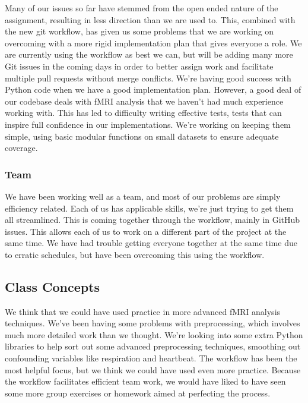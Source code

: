 \documentclass[11pt]{article}
\begin{document}
Many of our issues so far have stemmed from the open ended nature of the
assignment, resulting in less direction than we are used to. This, combined
with the new git workflow, has given us some problems that we are working on
overcoming with a more rigid implementation plan that gives everyone a role.
We are currently using the workflow as best we can, but will be adding many
more Git issues in the coming days in order to better assign work and
facilitate multiple pull requests without merge conflicts. We're having good
success with Python code when we have a good implementation plan. However, a
good deal of our codebase deals with fMRI analysis that we haven't had much
experience working with. This has led to difficulty writing effective tests,
tests that can inspire full confidence in our implementations. We're working on
keeping them simple, using basic modular functions on small datasets to ensure
adequate coverage.

\subsubsection{Team}

We have been working well as a team, and most of our problems are simply
efficiency related. Each of us has applicable skills, we're just trying to get
them all streamlined. This is coming together through the workflow, mainly in
GitHub issues. This allows each of us to work on a different part of the
project at the same time. We have had trouble getting everyone together at the
same time due to erratic schedules, but have been overcoming this using the
workflow.

\subsection{Class Concepts}

We think that we could have used practice in more advanced fMRI analysis
techniques. We've been having some problems with preprocessing, which involves
much more detailed work than we thought. We're looking into some extra Python
libraries to help sort out some advanced preprocessing techniques, smoothing
out confounding variables like respiration and heartbeat. The workflow has been
the most helpful focus, but we think we could have used even more practice.
Because the workflow facilitates efficient team work, we would have liked to
have seen some more group exercises or homework aimed at perfecting the
process.


\end{document}
